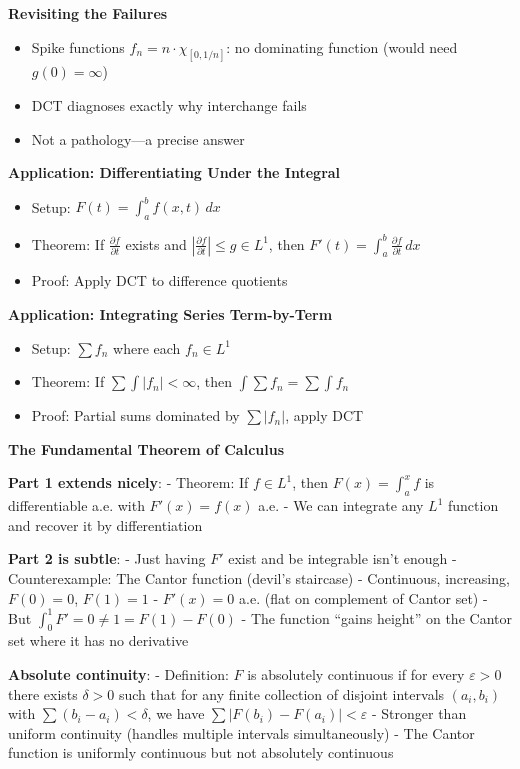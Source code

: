\documentclass[
  10pt,
  letterpaper,
]{scrbook}
\providecommand{\tightlist}{%
  \setlength{\itemsep}{0pt}\setlength{\parskip}{0pt}}
\begin{document}
\textbf{Revisiting the Failures}

\begin{itemize}
\tightlist
\item
  Spike functions \(f_n = n \cdot \chi_{[0,1/n]}\): no dominating
  function (would need \(g(0) = \infty\))
\item
  DCT diagnoses exactly why interchange fails
\item
  Not a pathology---a precise answer
\end{itemize}

\textbf{Application: Differentiating Under the Integral}

\begin{itemize}
\tightlist
\item
  Setup: \(F(t) = \int_a^b f(x,t) \, dx\)
\item
  Theorem: If \(\frac{\partial f}{\partial t}\) exists and
  \(\left| \frac{\partial f}{\partial t} \right| \leq g \in L^1\), then
  \(F'(t) = \int_a^b \frac{\partial f}{\partial t} \, dx\)
\item
  Proof: Apply DCT to difference quotients
\end{itemize}

\textbf{Application: Integrating Series Term-by-Term}

\begin{itemize}
\tightlist
\item
  Setup: \(\sum f_n\) where each \(f_n \in L^1\)
\item
  Theorem: If \(\sum \int |f_n| < \infty\), then
  \(\int \sum f_n = \sum \int f_n\)
\item
  Proof: Partial sums dominated by \(\sum |f_n|\), apply DCT
\end{itemize}

\textbf{The Fundamental Theorem of Calculus}

\textbf{Part 1 extends nicely}: - Theorem: If \(f \in L^1\), then
\(F(x) = \int_a^x f\) is differentiable a.e. with \(F'(x) = f(x)\) a.e.
- We can integrate any \(L^1\) function and recover it by
differentiation

\textbf{Part 2 is subtle}: - Just having \(F'\) exist and be integrable
isn't enough - Counterexample: The Cantor function (devil's staircase) -
Continuous, increasing, \(F(0) = 0\), \(F(1) = 1\) - \(F'(x) = 0\) a.e.
(flat on complement of Cantor set) - But
\(\int_0^1 F' = 0 \neq 1 = F(1) - F(0)\) - The function ``gains height''
on the Cantor set where it has no derivative

\textbf{Absolute continuity}: - Definition: \(F\) is absolutely
continuous if for every \(\varepsilon > 0\) there exists \(\delta > 0\)
such that for any finite collection of disjoint intervals \((a_i, b_i)\)
with \(\sum(b_i - a_i) < \delta\), we have
\(\sum |F(b_i) - F(a_i)| < \varepsilon\) - Stronger than uniform
continuity (handles multiple intervals simultaneously) - The Cantor
function is uniformly continuous but not absolutely continuous
\end{document}
